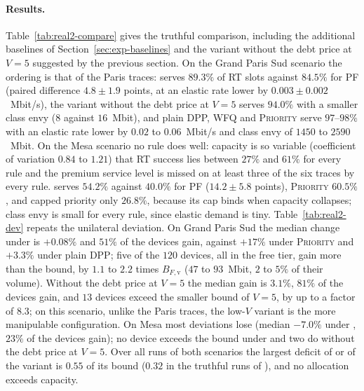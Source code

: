 \paragraph{Results.}
Table~\ref{tab:real2-compare} gives the truthful comparison, including the additional baselines of Section~\ref{sec:exp-baselines} and the variant without the debt price at $V=5$ suggested by the previous section.
On the Grand Paris Sud scenario the ordering is that of the Paris traces: \repay{} serves $89.3\%$ of RT slots against $84.5\%$ for \textsc{PF} (paired difference $4.8\pm1.9$ points, at an elastic rate lower by $0.003\pm0.002$~Mbit/s), the variant without the debt price at $V=5$ serves $94.0\%$ with a smaller class envy ($8$ against $16$~Mbit), and plain DPP, \textsc{WFQ} and \textsc{Priority} serve $97$--$98\%$ with an elastic rate lower by $0.02$ to $0.06$~Mbit/s and class envy of $1450$ to $2590$~Mbit.
On the Mesa scenario no rule does well: capacity is so variable (coefficient of variation $0.84$ to $1.21$) that RT success lies between $27\%$ and $61\%$ for every rule and the premium service level is missed on at least three of the six traces by every rule. \repay{} serves $54.2\%$ against $40.0\%$ for \textsc{PF} ($14.2\pm5.8$ points), \textsc{Priority} $60.5\%$, and capped priority only $26.8\%$, because its cap binds when capacity collapses; class envy is small for every rule, since elastic demand is tiny.
Table~\ref{tab:real2-dev} repeats the unilateral deviation.
On Grand Paris Sud the median change under \repay{} is $+0.08\%$ and $51\%$ of the devices gain, against $+17\%$ under \textsc{Priority} and $+3.3\%$ under plain DPP; five of the $120$ devices, all in the free tier, gain more than the bound, by $1.1$ to $2.2$ times $B_{F,\mathrm{v}}$ ($47$ to $93$~Mbit, $2$ to $5\%$ of their volume).
Without the debt price at $V=5$ the median gain is $3.1\%$, $81\%$ of the devices gain, and $13$ devices exceed the smaller bound of $V=5$, by up to a factor of $8.3$; on this scenario, unlike the Paris traces, the low-$V$ variant is the more manipulable configuration.
On Mesa most deviations lose (median $-7.0\%$ under \repay{}, $23\%$ of the devices gain); no device exceeds the bound under \repay{} and two do without the debt price at $V=5$.
Over all runs of both scenarios the largest deficit of \repay{} or of the variant is $0.55$ of its bound ($0.32$ in the truthful runs of \repay{}), and no allocation exceeds capacity.

\begin{table}[t]
\centering
\caption{Further trace-driven scenarios: session sources, chosen unit and capacity sources (means over the six windows).}
\label{tab:real2-traces}
\resizebox{\linewidth}{!}{}
\end{table}

